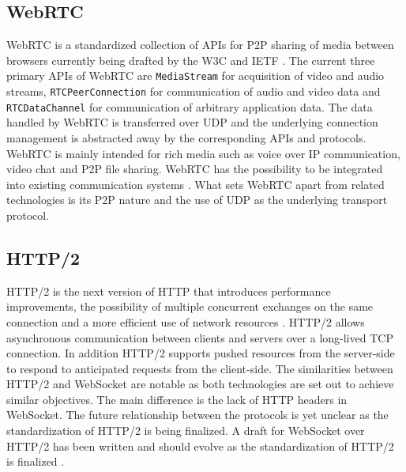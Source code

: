 \subsection{WebRTC}

WebRTC is a standardized collection of APIs for P2P sharing of media between browsers currently being drafted by the W3C and IETF \cite{bergkvist2012webrtc,alvestrand2014overview}. The current three primary APIs of WebRTC are \texttt{MediaStream} for acquisition of video and audio streams, \texttt{RTCPeerConnection} for communication of audio and video data and \texttt{RTCDataChannel} for communication of arbitrary application data. The data handled by WebRTC is transferred over UDP and the underlying connection management is abstracted away by the corresponding APIs and protocols. WebRTC is mainly intended for rich media such as voice over IP communication, video chat and P2P file sharing. WebRTC has the possibility to be integrated into existing communication systems \cite{johnston2013taking}. What sets WebRTC apart from related technologies is its P2P nature and the use of UDP as the underlying transport protocol.

\subsection{HTTP/2}

HTTP/2 is the next version of HTTP that introduces performance improvements, the possibility of multiple concurrent exchanges on the same connection and a more efficient use of network resources \cite{belshe2014hypertext}. HTTP/2 allows asynchronous communication between clients and servers over a long-lived TCP connection. In addition HTTP/2 supports pushed resources from the server-side to respond to anticipated requests from the client-side. The similarities between HTTP/2 and WebSocket are notable as both technologies are set out to achieve similar objectives. The main difference is the lack of HTTP headers in WebSocket. The future relationship between the protocols is yet unclear as the standardization of HTTP/2 is being finalized. A draft for WebSocket over HTTP/2 has been written and should evolve as the standardization of HTTP/2 is finalized \cite{hirano2014websocketoverhttp2}.